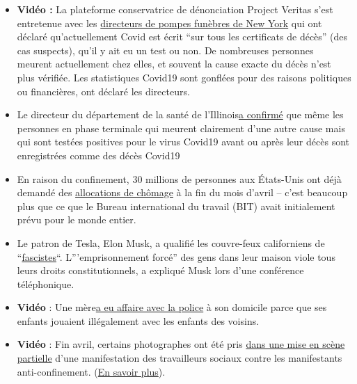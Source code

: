 \begin{itemize}
\tightlist
\item
  \textbf{Vidéo :} La plateforme conservatrice de dénonciation Project
  Veritas s'est entretenue avec les
  \href{https://www.youtube.com/watch?v=g5f_6ltv7oI}{directeurs de
  pompes funèbres de New York} qui ont déclaré qu'actuellement Covid est
  écrit ``sur tous les certificats de décès'' (des cas suspects), qu'il
  y ait eu un test ou non. De nombreuses personnes meurent actuellement
  chez elles, et souvent la cause exacte du décès n'est plus vérifiée.
  Les statistiques Covid19 sont gonflées pour des raisons politiques ou
  financières, ont déclaré les directeurs.
\item
  Le directeur du département de la santé de
  l'Illinois\href{https://week.com/2020/04/20/idph-director-explains-how-covid-deaths-are-classified/}{a
  confirmé} que même les personnes en phase terminale qui meurent
  clairement d'une autre cause mais qui sont testées positives pour le
  virus Covid19 avant ou après leur décès sont enregistrées comme des
  décès Covid19
\item
  En raison du confinement, 30 millions de personnes aux États-Unis ont
  déjà demandé des
  \href{https://edition.cnn.com/2020/04/30/economy/unemployment-benefits-coronavirus/index.html}{allocations
  de chômage} à la fin du mois d'avril -- c'est beaucoup plus que ce que
  le Bureau international du travail (BIT) avait initialement prévu pour
  le monde entier.
\item
  Le patron de Tesla, Elon Musk, a qualifié les couvre-feux californiens
  de
  ``\href{https://www.theguardian.com/technology/2020/apr/29/tesla-quarterly-earnings-coronavirus-shares}{fascistes}``.
  L'''emprisonnement forcé'' des gens dans leur maison viole tous leurs
  droits constitutionnels, a expliqué Musk lors d'une conférence
  téléphonique.
\item
  \textbf{Vidéo} : Une
  mère\href{https://twitter.com/AlexBerenson/status/1256219418343981056}{a
  eu affaire avec la police} à son domicile parce que ses enfants
  jouaient illégalement avec les enfants des voisins.
\item
  \textbf{Vidéo} : Fin avril, certains photographes ont été pris
  \href{https://twitter.com/talialikeitis/status/1253126254942773248}{dans
  une mise en scène partielle} d'une manifestation des travailleurs
  sociaux contre les manifestants anti-confinement.
  (\href{https://www.buzzfeednews.com/article/tasneemnashrulla/photos-denver-nurses-block-anti-lockdown-protest}{En
  savoir plus}).
\end{itemize}


